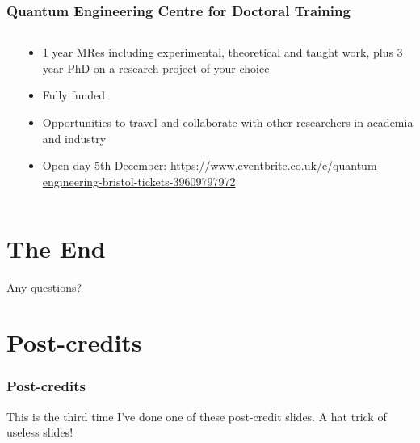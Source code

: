 \documentclass[]{beamer}
\begin{document}
\begin{frame}
\frametitle{Quantum Engineering Centre for Doctoral Training}

  \begin{columns}[T]
    \begin{column}{.5\textwidth}
    \begin{center}
    \end{center}
    \end{column}
    \begin{column}{.5\textwidth}
    \begin{itemize}
    \item 1 year MRes including experimental, theoretical and taught work, plus 3 year PhD on a research project of your choice
    
    \item Fully funded
    
    \item Opportunities to travel and collaborate with other researchers in academia and industry
    
    \item Open day 5th December: \url{https://www.eventbrite.co.uk/e/quantum-engineering-bristol-tickets-39609797972}
    \end{itemize}
    \end{column}
  \end{columns}

\end{frame}

\section{The End}

\begin{frame}
\begin{center}
Any questions?
\end{center}
\end{frame}

\section{Post-credits}

\begin{frame}[noframenumbering]
\frametitle{Post-credits}
This is the third time I've done one of these post-credit slides. A hat trick of useless slides!
\end{frame}

\end{document}
